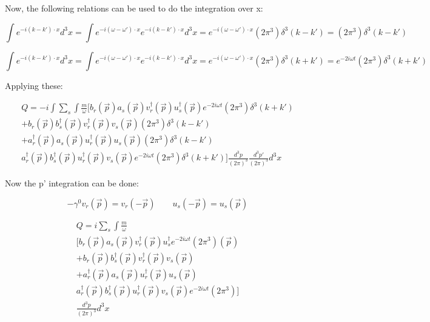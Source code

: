 \documentclass[a4]{article}
\begin{document}
    Now, the following relations can be used to do the integration over x:

    \begin{equation}
        \int e^{-i (k-k') \cdot x} d^3 x = \int e^{-i (\omega-\omega') \cdot x} e^{-i (k-k') \cdot x} d^3 x = e^{-i (\omega-\omega') \cdot x} (2 \pi^3) \delta^3 (k - k') = (2 \pi^3) \delta^3 (k - k')
    \end{equation}

    \begin{equation}
        \int e^{-i (k-k') \cdot x} d^3 x = \int e^{-i (\omega-\omega') \cdot x} e^{-i (k-k') \cdot x} d^3 x = e^{-i (\omega-\omega') \cdot x} (2 \pi^3) \delta^3 (k + k') = e^{-2i \omega t} (2 \pi^3) \delta^3 (k + k')
    \end{equation}

    Applying these:

    \begin{equation}
        \begin{aligned}
            Q = - i \int \sum_{s} \int \frac{m}{\omega} [b_r (\vec{p}) a_s (\vec{p}) v_r^{\dagger} (\vec{p}) u_s^{\dagger} (\vec{p}) e^{-2i \omega t} (2 \pi^3) \delta^3 (k + k') \\
            + b_r (\vec{p}) b_s^{\dagger} (\vec{p}) v_r^{\dagger} (\vec{p}) v_s (\vec{p}) (2 \pi^3) \delta^3 (k - k') \\
            + a_r^{\dagger} (\vec{p}) a_s (\vec{p}) u_r^{\dagger} (\vec{p}) u_s (\vec{p}) (2 \pi^3) \delta^3 (k - k') \\
            a_r^{\dagger} (\vec{p}) b_s^{\dagger} (\vec{p}) u_r^{\dagger} (\vec{p}) v_s (\vec{p}) e^{-2i \omega t} (2 \pi^3) \delta^3 (k + k')] \frac{d^{3} p}{(2 \pi)^3} \frac{d^{3} p'}{(2 \pi)^3} d^3 x
        \end{aligned}
    \end{equation}

    Now the p' integration can be done:

    \begin{equation}
        - \gamma^0 v_r (\vec{p}) = v_r (- \vec{p}) \qquad u_s (- \vec{p}) = u_s (\vec{p})
    \end{equation}

    \begin{equation}
        \begin{aligned}
            Q = i \sum_{s} \int \frac{m}{\omega} \\
        [b_r (\vec{p}) a_s (\vec{p}) v_r^{\dagger} (\vec{p}) u_s^{\dagger} e^{-2i \omega t} (2 \pi^3) (\vec{p}) \\
        + b_r (\vec{p}) b_s^{\dagger} (\vec{p}) v_r^{\dagger} (\vec{p}) v_s (\vec{p}) \\
        + a_r^{\dagger} (\vec{p}) a_s (\vec{p}) u_r^{\dagger} (\vec{p}) u_s (\vec{p}) \\
        a_r^{\dagger} (\vec{p}) b_s^{\dagger} (\vec{p}) u_r^{\dagger} (\vec{p}) v_s (\vec{p}) e^{-2i \omega t} (2 \pi^3)] \\
        \frac{d^{3} p}{(2 \pi)^3} d^3 x
        \end{aligned}
    \end{equation}
\end{document}
